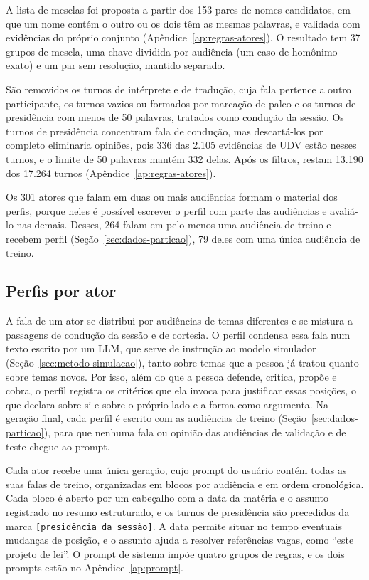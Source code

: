 A lista de mesclas foi proposta a partir dos 153 pares de nomes candidatos, em que um nome contém o
outro ou os dois têm as mesmas palavras, e validada com evidências do próprio conjunto
(Apêndice~\ref{ap:regras-atores}). O resultado tem 37 grupos de mescla, uma chave dividida por
audiência (um caso de homônimo exato) e um par sem resolução, mantido separado.

São removidos os turnos de intérprete e de tradução, cuja fala pertence a outro participante, os
turnos vazios ou formados por marcação de palco e os turnos de presidência com menos de 50 palavras,
tratados como condução da sessão. Os turnos de presidência concentram fala de condução, mas
descartá-los por completo eliminaria opiniões, pois 336 das 2.105 evidências de UDV estão nesses
turnos, e o limite de 50 palavras mantém 332 delas. Após os filtros, restam 13.190 dos 17.264 turnos
(Apêndice~\ref{ap:regras-atores}).

Os 301 atores que falam em duas ou mais audiências formam o material dos perfis, porque neles é
possível escrever o perfil com parte das audiências e avaliá-lo nas demais. Desses, 264 falam em
pelo menos uma audiência de treino e recebem perfil (Seção~\ref{sec:dados-particao}), 79 deles com
uma única audiência de treino.

\subsection{Perfis por ator}
\label{sec:metodo-perfis}

A fala de um ator se distribui por audiências de temas diferentes e se mistura a passagens de
condução da sessão e de cortesia. O perfil condensa essa fala num texto escrito por um LLM, que serve
de instrução ao modelo simulador (Seção~\ref{sec:metodo-simulacao}), tanto sobre temas que a
pessoa já tratou quanto sobre temas novos. Por isso, além do que a pessoa defende, critica, propõe e
cobra, o perfil registra os critérios que ela invoca para justificar essas posições, o que declara
sobre si e sobre o próprio lado e a forma como argumenta. Na geração final, cada perfil é escrito
com as audiências de treino (Seção~\ref{sec:dados-particao}), para que nenhuma fala ou opinião das
audiências de validação e de teste chegue ao prompt.

Cada ator recebe uma única geração, cujo prompt do usuário contém todas as suas falas de treino,
organizadas em blocos por audiência e em ordem cronológica. Cada bloco é aberto por um cabeçalho com a
data da matéria e o assunto registrado no resumo estruturado, e os turnos de presidência são
precedidos da marca \texttt{[presidência da sessão]}. A data permite situar no tempo eventuais
mudanças de posição, e o assunto ajuda a resolver referências vagas, como ``este projeto de lei''. O
prompt de sistema impõe quatro grupos de regras, e os dois prompts estão no
Apêndice~\ref{ap:prompt}.

